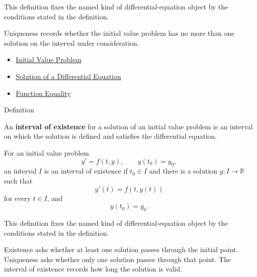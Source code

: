 \begin{remark*}
This definition fixes the named kind of differential-equation object by the
conditions stated in the definition.
\end{remark*}

\begin{remark*}[Interpretation]
Uniqueness records whether the initial value problem has no more than one
solution on the interval under consideration.
\end{remark*}

\begin{dependencies}
\begin{itemize}
  \item \hyperref[def:ordinary-differential-equations-solutions-initial-value-problem]{Initial Value Problem}
  \item \hyperref[def:ordinary-differential-equations-terminology-solution-of-a-differential-equation]{Solution of a Differential Equation}
  \item \hyperref[def:function-equality]{Function Equality}
\end{itemize}
\end{dependencies}

\begin{definitionbox}{Definition}
\begin{definition}
\label{def:ordinary-differential-equations-solutions-interval-of-existence}
An \textbf{interval of existence} for a solution of an initial value problem is an interval on which the solution is defined and satisfies the differential equation.

For an initial value problem
\[
y'=f(t,y),
\qquad
y(t_0)=y_0,
\]
an interval $I$ is an interval of existence if $t_0\in I$ and there is a solution $y:I\to\mathbb{R}$ such that
\[
y'(t)=f(t,y(t))
\]
for every $t\in I$, and
\[
y(t_0)=y_0.
\]
\end{definition}
\end{definitionbox}

\begin{remark*}
This definition fixes the named kind of differential-equation object by the
conditions stated in the definition.
\end{remark*}

\begin{remark*}[Interpretation]
Existence asks whether at least one solution passes through the initial point. Uniqueness asks whether only one solution passes through that point. The interval of existence records how long the solution is valid.
\end{remark*}

